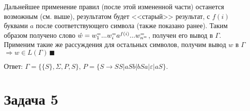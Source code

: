 \documentclass[a4paper]{article}
\begin{document}
\begin{itemize}
\begin{enumerate}
\end{enumerate}
Дальнейшее применение правил (после этой измененной части) останется возможным (см. выше), результатом будет <<старый>> результат, с $f(i)$ буквами $a$ после соответствующего символа (также показано ранее).\newline
Таким образом получено слово $\acute{w}=w^=_1...w^=_ia^{f(i)}...w^=_{n^=}$, получен его вывод в $\Gamma$. Применим такие же рассуждения для остальных символов, получим вывод $w$ в $\Gamma$ $\Rightarrow w\in L(\Gamma)\,\blacksquare$
\end{itemize}
$\boxed{\mbox{Ответ: } \Gamma=\{\{S\},\Sigma,P,S\},\,P=\big\{S\longrightarrow SS\big|aSb\big|bSa\big|\varepsilon\big|aS\big\}.}$
\section*{Задача 5}
\end{document}
